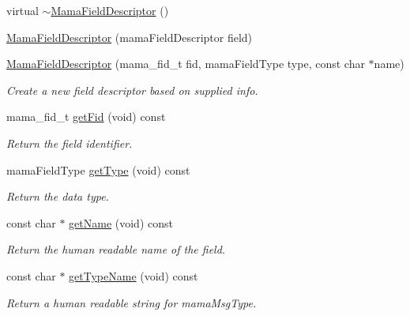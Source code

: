 \begin{DoxyCompactItemize}
\item 
virtual \hyperlink{classWombat_1_1MamaFieldDescriptor_a4cdfb03e5132217d4eda78ba12ab48e8}{$\sim$MamaFieldDescriptor} ()
\item 
\hyperlink{classWombat_1_1MamaFieldDescriptor_a3de9bbef1117efb9a923eb9e71381958}{MamaFieldDescriptor} (mamaFieldDescriptor field)
\item 
\hyperlink{classWombat_1_1MamaFieldDescriptor_a05360c572e90e2b40948888678659ab7}{MamaFieldDescriptor} (mama\_\-fid\_\-t fid, mamaFieldType type, const char $\ast$name)
\begin{DoxyCompactList}\small\item\em Create a new field descriptor based on supplied info. \item\end{DoxyCompactList}\item 
mama\_\-fid\_\-t \hyperlink{classWombat_1_1MamaFieldDescriptor_afb11a9cdf32d945f6c6bc30e1d043e47}{getFid} (void) const 
\begin{DoxyCompactList}\small\item\em Return the field identifier. \item\end{DoxyCompactList}\item 
mamaFieldType \hyperlink{classWombat_1_1MamaFieldDescriptor_a1783c189fbe1218b8588b832e565193f}{getType} (void) const 
\begin{DoxyCompactList}\small\item\em Return the data type. \item\end{DoxyCompactList}\item 
const char $\ast$ \hyperlink{classWombat_1_1MamaFieldDescriptor_ada55a2d1cdca7e1e90395bd1033c63e6}{getName} (void) const 
\begin{DoxyCompactList}\small\item\em Return the human readable name of the field. \item\end{DoxyCompactList}\item 
const char $\ast$ \hyperlink{classWombat_1_1MamaFieldDescriptor_acd4bd3e856377a60fa553cfb5786e461}{getTypeName} (void) const 
\begin{DoxyCompactList}\small\item\em Return a human readable string for mamaMsgType. \item\end{DoxyCompactList}\item 

\end{DoxyCompactItemize}
